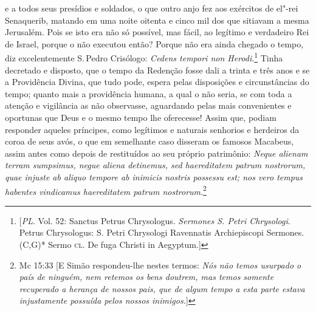 e a todos seus presídios e soldados, o que outro anjo fez aos exércitos
de el"-rei Senaquerib, matando em uma noite oitenta e cinco mil dos que
sitiavam a mesma Jerusalém. Pois se isto era não só possível, mas fácil,
ao legítimo e verdadeiro Rei de Israel, porque o não executou então?
Porque não era ainda chegado o tempo, diz excelentemente S.\,Pedro
Crisólogo: \emph{Cedens tempori non Herodi}.\footnote{[\textit{PL}. Vol. 52: Sanctus Petrus Chrysologus. \textit{Sermones S. Petri Chrysologi}. Petrus Chrysologus: S. Petri Chrysologi Ravennatis Archiepiscopi Sermones. (C,G)* Sermo \textsc{cl}. De fuga Christi in Aegyptum.]} Tinha decretado e disposto,
que o tempo da Redenção fosse dali a trinta e três anos e se a
Providência Divina, que tudo pode, espera pelas disposições e
circunstâncias do tempo; quanto mais a providência humana, a qual o não
seria, se com toda a atenção e vigilância as não observasse, aguardando
pelas mais convenientes e oportunas que Deus e o mesmo tempo lhe
oferecesse! Assim que, podiam responder aqueles príncipes, como
legítimos e naturais senhorios e herdeiros da coroa de seus avós, o que
em semelhante caso disseram os famosos Macabeus, assim antes como depois
de restituídos ao seu próprio patrimônio: \emph{Neque alienam terram
sumpsimus, negue aliena detinemus, sed haereditatem patrum nostrorum,
quae injuste ab aliquo tempore ab inimicis nostris possessu est; nos
vero tempus habentes vindicamus haereditatem patrum nostrorum}.\footnote{Mc 15:33 [E Simão respondeu-lhe nestes termos: \textit{Nós não temos usurpado o país de ninguém, nem retemos os bens doutrem, mas temos somente recuperado a herança de nossos pais, que de algum tempo a esta parte estava injustamente possuída pelos nossos inimigos.}]}

